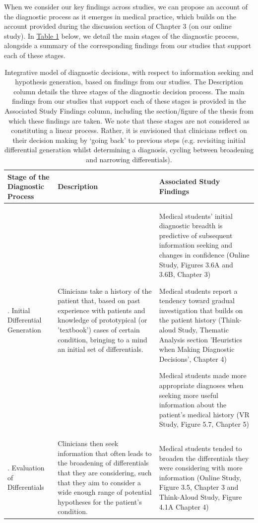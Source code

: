 \documentclass[a4paper, nobind]{templates/ociamthesis}
\begin{document}
When we consider our key findings across studies, we can propose an account of the diagnostic process as it emerges in medical practice, which builds on the account provided during the discussion section of Chapter 3 (on our online study). In \hyperref[tab:integrative]{Table \ref{tab:integrative}} below, we detail the main stages of the diagnostic process, alongside a summary of the corresponding findings from our studies that support each of these stages.

\begin{longtable}[t]{>{\raggedright\arraybackslash}p{5em}|>{\raggedright\arraybackslash}p{12em}|>{\raggedright\arraybackslash}p{16em}}
\caption{\label{tab:integrative}Integrative model of diagnostic decisions, with respect to information seeking and hypothesis generation, based on findings from our studies. The Description column details the three stages of the diagnostic decision process. The main findings from our studies that support each of these stages is provided in the Associated Study Findings column, including the section/figure of the thesis from which these findings are taken. We note that these stages are not considered as constituting a linear process. Rather, it is envisioned that clinicians reflect on their decision making by ‘going back’ to previous steps (e.g. revisiting initial differential generation whilst determining a diagnosis, cycling between broadening and narrowing differentials).}\\
\hline
Stage of the Diagnostic Process & Description & Associated Study Findings\\
\hline
1. Initial Differential Generation & Clinicians take a history of the patient that, based on past experience with patients and knowledge of prototypical (or 'textbook') cases of certain condition, bringing to a mind an initial set of differentials. & Medical students' initial diagnostic breadth is predictive of subsequent information seeking and changes in confidence (Online Study, Figures 3.6A and 3.6B, Chapter 3)

Medical students report a tendency toward gradual investigation that builds on the patient history (Think-aloud Study, Thematic Analysis section 'Heuristics when Making Diagnostic Decisions', Chapter 4)

Medical students made more appropriate diagnoses when seeking more useful information about the patient's medical history (VR Study, Figure 5.7, Chapter 5)\\
\hline
2. Evaluation of Differentials & Clinicians then seek information that often leads to the broadening of differentials that they are considering, such that they aim to consider a wide enough range of potential hypotheses for the patient's condition. & Medical students tended to broaden the differentials they were considering with more information (Online Study, Figure 3.5, Chapter 3 and Think-Aloud Study, Figure 4.1A Chapter 4)


\end{longtable}
\end{document}
